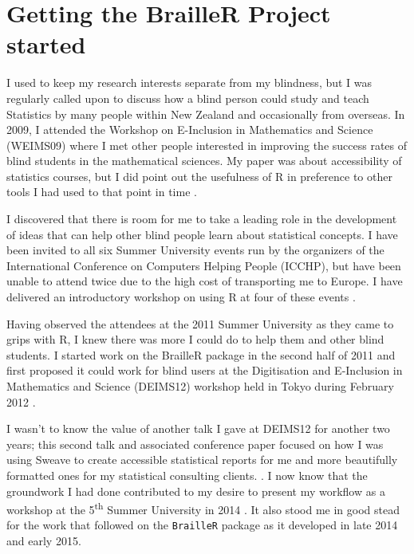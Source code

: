 \documentclass[
]{book}
\begin{document}
\hypertarget{getting-the-brailler-project-started}{%
\section{Getting the BrailleR Project started}\label{getting-the-brailler-project-started}}

I used to keep my research interests separate from my blindness, but I was regularly called upon to discuss how a blind person could study and teach Statistics by many people within New Zealand and occasionally from overseas. In 2009, I attended the Workshop on E-Inclusion in Mathematics and Science (WEIMS09) where I met other people interested in improving the success rates of blind students in the mathematical sciences. My paper was about accessibility of statistics courses, but I did point out the usefulness of R in preference to other tools I had used to that point in time \citep{Godfrey2009AccessiblePaper}.

I discovered that there is room for me to take a leading role in the development of ideas that can help other blind people learn about statistical concepts. I have been invited to all six Summer University events run by the organizers of the International Conference on Computers Helping People (ICCHP), but have been unable to attend twice due to the high cost of transporting me to Europe. I have delivered an introductory workshop on using R at four of these events \citetext{\citealp{Godfrey2011SU-R}; \citealp{Godfrey2013SU-R}; \citealp{Godfrey2014SU-R}; \citealp[and][]{Godfrey2016SU-R}}.

Having observed the attendees at the 2011 Summer University as they came to grips with R, I knew there was more I could do to help them and other blind students. I started work on the BrailleR package \citep{Rpkg-BrailleR} in the second half of 2011 and first proposed it could work for blind users at the Digitisation and E-Inclusion in Mathematics and Science (DEIMS12) workshop held in Tokyo during February 2012 \citep{Godfrey2012BrailleRPaper}.

I wasn't to know the value of another talk I gave at DEIMS12 for another two years; this second talk and associated conference paper focused on how I was using Sweave to create accessible statistical reports for me and more beautifully formatted ones for my statistical consulting clients.
\citep{Godfrey2012PuttingPaper}. I now know that the groundwork I had done contributed to my desire to present my workflow as a workshop at the 5\textsuperscript{th} Summer University in 2014 \citep{Godfrey2014SU-Sweave}.
It also stood me in good stead for the work that followed on the \texttt{BrailleR} package as it developed in late 2014 and early 2015.
\end{document}
